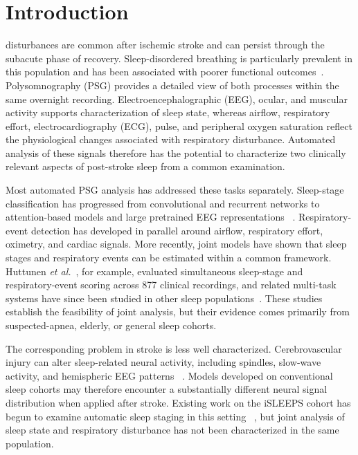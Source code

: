 \documentclass{ieeeaccess}
\begin{document}
\section{Introduction}

 disturbances are common after ischemic stroke and can persist
through the subacute phase of recovery. Sleep-disordered breathing is particularly
prevalent in this population and has been associated with poorer functional
outcomes~\cite{bassetti2006sleep,denis2024sleep,tellenbach2023brainstem,johnson2010frequency}.
Polysomnography (PSG) provides a detailed view of both processes within the same
overnight recording. Electroencephalographic (EEG), ocular, and muscular activity
supports characterization of sleep state, whereas airflow, respiratory effort,
electrocardiography (ECG), pulse, and peripheral oxygen saturation reflect the
physiological changes associated with respiratory disturbance. Automated analysis
of these signals therefore has the potential to characterize two clinically
relevant aspects of post-stroke sleep from a common examination.

Most automated PSG analysis has addressed these tasks separately. Sleep-stage
classification has progressed from convolutional and recurrent networks to
attention-based models and large pretrained EEG representations
~\cite{supratak2017deepsleepnet,phan2019seqsleepnet,eldele2021attnsleep,
supratak2020tinysleepnet,labram2024,cbramod2025,eegpt2024,biot2023}.
Respiratory-event detection has developed in parallel around airflow, respiratory
effort, oximetry, and cardiac signals. More recently, joint models have shown that
sleep stages and respiratory events can be estimated within a common framework.
Huttunen \emph{et al.}~\cite{huttunen2023simultaneous}, for example, evaluated
simultaneous sleep-stage and respiratory-event scoring across 877 clinical
recordings, and related multi-task systems have since been studied in other sleep
populations~\cite{multitask2025elderly}. These studies establish the feasibility
of joint analysis, but their evidence comes primarily from suspected-apnea,
elderly, or general sleep cohorts.

The corresponding problem in stroke is less well characterized. Cerebrovascular
injury can alter sleep-related neural activity, including spindles, slow-wave
activity, and hemispheric EEG patterns
~\cite{gottselig2002stroke,fernandez2019spindles,facchin2020slowwaves,
simpson2023laterality,zheng2025spindles,anastasi2017bsi}. Models developed on
conventional sleep cohorts may therefore encounter a substantially different
neural signal distribution when applied after stroke. Existing work on the
iSLEEPS cohort has begun to examine automatic sleep staging in this setting
~\cite{maiti2026isleeps,bose2026gap}, but joint analysis of sleep state and
respiratory disturbance has not been characterized in the same population.
\end{document}
